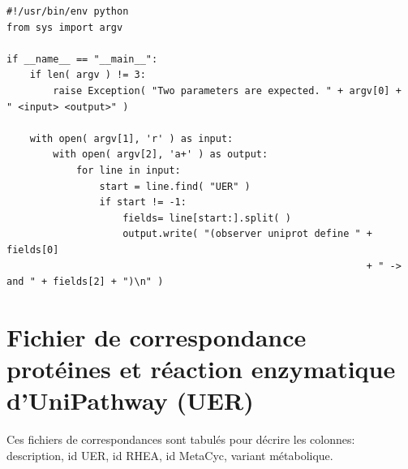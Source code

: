 \begin{lstlisting}[style=python-style,caption=mappingUER\_Metacyc.py]
#!/usr/bin/env python
from sys import argv

if __name__ == "__main__":
    if len( argv ) != 3:
        raise Exception( "Two parameters are expected. " + argv[0] +  " <input> <output>" )
    
    with open( argv[1], 'r' ) as input:
        with open( argv[2], 'a+' ) as output:
            for line in input:
                start = line.find( "UER" )
                if start != -1:
                    fields= line[start:].split( )
                    output.write( "(observer uniprot define " + fields[0]
                                                              + " -> and " + fields[2] + ")\n" )
\end{lstlisting}

\section{Fichier de correspondance protéines et réaction enzymatique d'UniPathway (UER)}

Ces fichiers de correspondances sont tabulés pour décrire les colonnes: description, id UER, id RHEA, id MetaCyc, variant métabolique.

